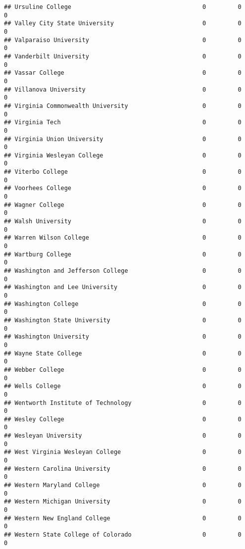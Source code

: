 \documentclass[
]{article}
\begin{document}
\begin{verbatim}
## Ursuline College                                     0         0           0
## Valley City State University                         0         0           0
## Valparaiso University                                0         0           0
## Vanderbilt University                                0         0           0
## Vassar College                                       0         0           0
## Villanova University                                 0         0           0
## Virginia Commonwealth University                     0         0           0
## Virginia Tech                                        0         0           0
## Virginia Union University                            0         0           0
## Virginia Wesleyan College                            0         0           0
## Viterbo College                                      0         0           0
## Voorhees College                                     0         0           0
## Wagner College                                       0         0           0
## Walsh University                                     0         0           0
## Warren Wilson College                                0         0           0
## Wartburg College                                     0         0           0
## Washington and Jefferson College                     0         0           0
## Washington and Lee University                        0         0           0
## Washington College                                   0         0           0
## Washington State University                          0         0           0
## Washington University                                0         0           0
## Wayne State College                                  0         0           0
## Webber College                                       0         0           0
## Wells College                                        0         0           0
## Wentworth Institute of Technology                    0         0           0
## Wesley College                                       0         0           0
## Wesleyan University                                  0         0           0
## West Virginia Wesleyan College                       0         0           0
## Western Carolina University                          0         0           0
## Western Maryland College                             0         0           0
## Western Michigan University                          0         0           0
## Western New England College                          0         0           0
## Western State College of Colorado                    0         0           0

\end{verbatim}
\end{document}
